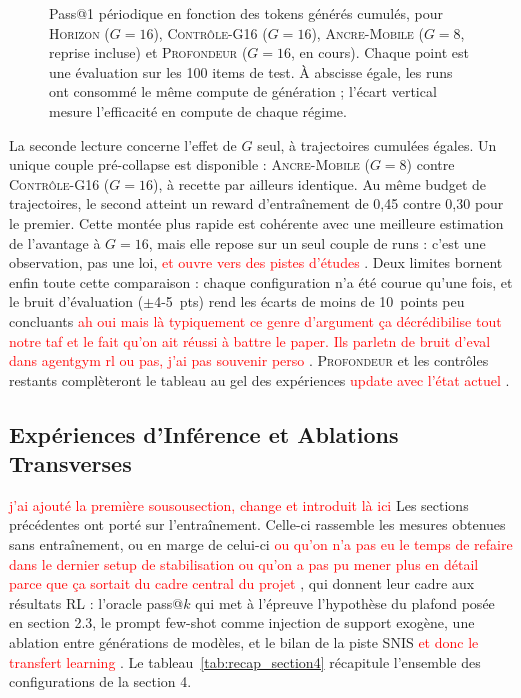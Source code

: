 \documentclass[11pt,a4paper]{article}
\begin{document}
\begin{figure}[htbp]
\centering
{}
\caption{Pass@1 périodique en fonction des tokens générés cumulés, pour \textsc{Horizon} ($G=16$), \textsc{Contrôle-G16} ($G=16$), \textsc{Ancre-Mobile} ($G=8$, reprise incluse) et \textsc{Profondeur} ($G=16$, en cours). Chaque point est une évaluation sur les 100 items de test. À abscisse égale, les runs ont consommé le même compute de génération ; l'écart vertical mesure l'efficacité en compute de chaque régime.}
\label{fig:pass1-tokens}
\end{figure}

La seconde lecture concerne l'effet de $G$ seul, à trajectoires cumulées égales. Un unique couple pré-collapse est disponible : \textsc{Ancre-Mobile} ($G=8$) contre \textsc{Contrôle-G16} ($G=16$), à recette par ailleurs identique. Au même budget de trajectoires, le second atteint un reward d'entraînement de 0{,}45 contre 0{,}30 pour le premier. Cette montée plus rapide est cohérente avec une meilleure estimation de l'avantage à $G=16$, mais elle repose sur un seul couple de runs : c'est une observation, pas une loi, \textcolor{red}{et ouvre vers des pistes d'études} . Deux limites bornent enfin toute cette comparaison : chaque configuration n'a été courue qu'une fois, et le bruit d'évaluation ($\pm$4-5~pts) rend les écarts de moins de 10~points peu concluants \textcolor{red}{ah oui mais là typiquement ce genre d'argument ça décrédibilise tout notre taf et le fait qu'on ait réussi à battre le paper. Ils parletn de bruit d'eval dans agentgym rl ou pas, j'ai pas souvenir perso} . \textsc{Profondeur} et les contrôles restants complèteront le tableau au gel des expériences \textcolor{red}{update avec l'état actuel} .









\subsection{Expériences d'Inférence et Ablations Transverses}
\label{sec:inference_ablations}

\textcolor{red}{j'ai ajouté la première sousousection, change et introduit là ici} 
Les sections précédentes ont porté sur l'entraînement. Celle-ci rassemble les mesures obtenues sans entraînement, ou en marge de celui-ci \textcolor{red}{ou qu'on n'a pas eu le temps de refaire dans le dernier setup de stabilisation ou qu'on a pas pu mener plus en détail parce que ça sortait du cadre central du projet} , qui donnent leur cadre aux résultats RL : l'oracle pass@$k$ qui met à l'épreuve l'hypothèse du plafond posée en section 2.3, le prompt few-shot comme injection de support exogène, une ablation entre générations de modèles, et le bilan de la piste SNIS \textcolor{red}{et donc le transfert learning} . Le tableau~\ref{tab:recap_section4} récapitule l'ensemble des configurations de la section 4.
\end{document}
